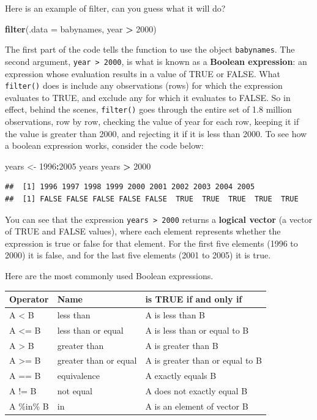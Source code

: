 \documentclass[]{book}
\newenvironment{Shaded}{\begin{snugshade}}{\end{snugshade}}
\newcommand{\DataTypeTok}[1]{\textcolor[rgb]{0.13,0.29,0.53}{#1}}
\newcommand{\DecValTok}[1]{\textcolor[rgb]{0.00,0.00,0.81}{#1}}
\newcommand{\KeywordTok}[1]{\textcolor[rgb]{0.13,0.29,0.53}{\textbf{#1}}}
\newcommand{\NormalTok}[1]{#1}
\newcommand{\OperatorTok}[1]{\textcolor[rgb]{0.81,0.36,0.00}{\textbf{#1}}}
\newcommand{\StringTok}[1]{\textcolor[rgb]{0.31,0.60,0.02}{#1}}
\begin{document}
Here is an example of filter, can you guess what it will do?

\begin{Shaded}
\begin{Highlighting}[]
 \KeywordTok{filter}\NormalTok{(}\DataTypeTok{.data =}\NormalTok{ babynames, year }\OperatorTok{>}\StringTok{ }\DecValTok{2000}\NormalTok{)}
\end{Highlighting}
\end{Shaded}

The first part of the code tells the function to use the object \texttt{babynames}. The second argument, \texttt{year\ \textgreater{}\ 2000}, is what is known as a \textbf{Boolean expression}: an expression whose evaluation results in a value of TRUE or FALSE. What \texttt{filter()} does is include any observations (rows) for which the expression evaluates to TRUE, and exclude any for which it evaluates to FALSE. So in effect, behind the scenes, \texttt{filter()} goes through the entire set of 1.8 million observations, row by row, checking the value of year for each row, keeping it if the value is greater than 2000, and rejecting it if it is less than 2000. To see how a boolean expression works, consider the code below:

\begin{Shaded}
\begin{Highlighting}[]
\NormalTok{years <-}\StringTok{ }\DecValTok{1996}\OperatorTok{:}\DecValTok{2005}
\NormalTok{years}
\NormalTok{years }\OperatorTok{>}\StringTok{ }\DecValTok{2000}
\end{Highlighting}
\end{Shaded}

\begin{verbatim}
##  [1] 1996 1997 1998 1999 2000 2001 2002 2003 2004 2005
##  [1] FALSE FALSE FALSE FALSE FALSE  TRUE  TRUE  TRUE  TRUE  TRUE
\end{verbatim}

You can see that the expression \texttt{years\ \textgreater{}\ 2000} returns a \textbf{logical vector} (a vector of TRUE and FALSE values), where each element represents whether the expression is true or false for that element. For the first five elements (1996 to 2000) it is false, and for the last five elements (2001 to 2005) it is true.

Here are the most commonly used Boolean expressions.

\begin{longtable}[]{@{}lll@{}}
\toprule
Operator & Name & is TRUE if and only if\tabularnewline
\midrule
\endhead
A \textless{} B & less than & A is less than B\tabularnewline
A \textless{}= B & less than or equal & A is less than or equal to B\tabularnewline
A \textgreater{} B & greater than & A is greater than B\tabularnewline
A \textgreater{}= B & greater than or equal & A is greater than or equal to B\tabularnewline
A == B & equivalence & A exactly equals B\tabularnewline
A != B & not equal & A does not exactly equal B\tabularnewline
A \%in\% B & in & A is an element of vector B\tabularnewline
\bottomrule
\end{longtable}
\end{document}
